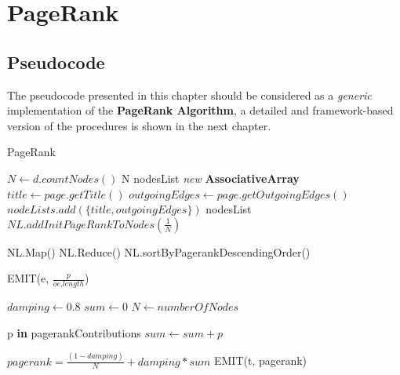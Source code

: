 \section{PageRank}

\subsection{Pseudocode}
The pseudocode presented in this chapter should be considered as a \textit{generic} implementation of the \textbf{PageRank Algorithm}, a detailed and framework-based version of the procedures is shown in the next chapter.

\begin{algorithm}[H]
	\caption{PageRank}\label{General}
		\begin{algorithmic}[1]
			
				\State $N \gets d.countNodes()$
				\State \Return N
			\EndProcedure
\newline			
				\State nodesList \textit{new} \textbf{AssociativeArray}
					\State $title \gets page.getTitle()$
					\State $outgoingEdges \gets page.getOutgoingEdges()$
					\State $nodeLists.add(\{ title, outgoingEdges\}) $
				\EndFor
				\State \Return nodesList
			\EndProcedure
	\newline		
				\State $NL.addInitPageRankToNodes(\frac{1}{N})$
				
					\State NL.Map()
					\State NL.Reduce()
				\EndFor
				\State NL.sortByPagerankDescendingOrder()
				
			\EndProcedure
\newline
					\State EMIT(e, $\frac{p}{oe.length}$)
				\EndFor
			\EndProcedure
						
				\State $damping \gets 0.8$
				\State $sum \gets 0$
				\State $N \gets numberOfNodes$
				
				\ForAll p \textbf{in} pagerankContributions
					\State $sum \gets sum + p$
				\EndFor
				
				\State $pagerank =  \frac{(1-damping)}{N} + damping*sum$
				\State EMIT(t, pagerank)
			\EndProcedure
	\end{algorithmic}
\end{algorithm}
